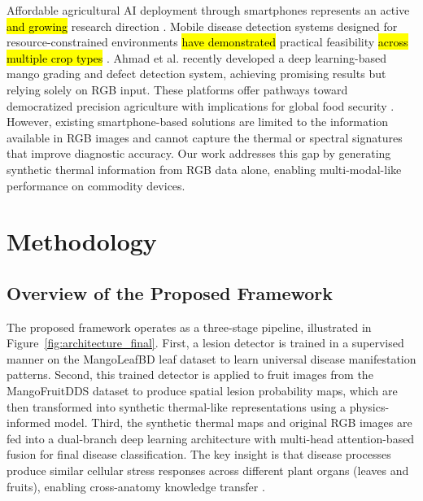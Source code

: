 \documentclass[utf8]{FrontiersinHarvard}
\newenvironment{revblock}{}{}
\begin{document}
Affordable agricultural AI deployment through smartphones represents an active \hl{and growing} research direction \cite{pongnumkul2015,coulibaly2022}. Mobile disease detection systems designed for resource-constrained environments \hl{have demonstrated} practical feasibility \hl{across multiple crop types} \cite{li2020,picon2022}. \begin{revblock}Ahmad et al. \cite{ahmad2023} recently developed a deep learning-based mango grading and defect detection system, achieving promising results but relying solely on RGB input.\end{revblock} These platforms offer pathways toward democratized precision agriculture with implications for global food security \cite{liu2020_yolo}. \begin{revblock}However, existing smartphone-based solutions are limited to the information available in RGB images and cannot capture the thermal or spectral signatures that improve diagnostic accuracy. Our work addresses this gap by generating synthetic thermal information from RGB data alone, enabling multi-modal-like performance on commodity devices.\end{revblock}

\section{Methodology}

\begin{revblock}
\subsection{Overview of the Proposed Framework}
The proposed framework operates as a three-stage pipeline, illustrated in Figure~\ref{fig:architecture_final}. First, a lesion detector is trained in a supervised manner on the MangoLeafBD leaf dataset to learn universal disease manifestation patterns. Second, this trained detector is applied to fruit images from the MangoFruitDDS dataset to produce spatial lesion probability maps, which are then transformed into synthetic thermal-like representations using a physics-informed model. Third, the synthetic thermal maps and original RGB images are fed into a dual-branch deep learning architecture with multi-head attention-based fusion for final disease classification. The key insight is that disease processes produce similar cellular stress responses across different plant organs (leaves and fruits), enabling cross-anatomy knowledge transfer \cite{bock2010,savary2019}.
\end{revblock}
\end{document}
